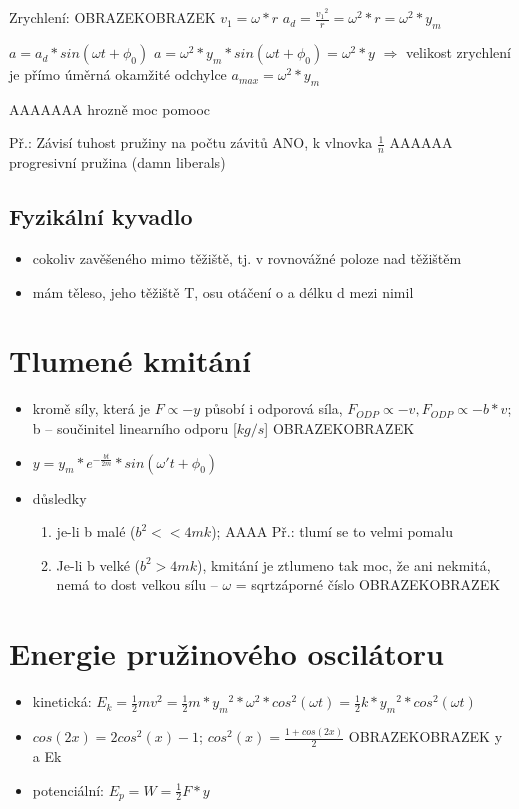 \documentclass{article}
\begin{document}
Zrychlení: OBRAZEKOBRAZEK
           $v_1 = \omega * r$
           $a_d = \frac{{v_1}^2}{r} = \omega^2 * r = \omega^2 * y_m$

           $a = a_d * sin(\omega t + {\phi}_0)$
           $a = \omega^2 * y_m * sin(\omega t + {\phi}_0) = \omega^2 * y$ $\Rightarrow$ velikost zrychlení je přímo úměrná okamžité odchylce
           $a_{max} = \omega^2 * y_m$

AAAAAAA hrozně moc pomooc

Př.: Závisí tuhost pružiny na počtu závitů
     ANO, k {vlnovka} $\frac{1}{n}$
     AAAAAA progresivní pružina (damn liberals)

\subsection{Fyzikální kyvadlo}
\begin{itemize}
  \item cokoliv zavěšeného mimo těžiště, tj. v rovnovážné poloze nad těžištěm
  \item mám těleso, jeho těžiště T, osu otáčení o a délku d mezi nimil
\end{itemize}

\section{Tlumené kmitání}
\begin{itemize}
  \item kromě síly, která je $F \propto -y$ působí i odporová síla, $F_{ODP} \propto -v, F_{ODP} \propto -b*v$; b -- součinitel linearního odporu [$kg/s$] OBRAZEKOBRAZEK
  \item $y = y_m * e^{- \frac{bt}{2m}}*sin(\omega' t + {\phi}_{0})$
  \item důsledky
  \begin{enumerate}
    \item je-li b malé ($b^2 << 4mk$); AAAA Př.: tlumí se to velmi pomalu
    \item Je-li b velké ($b^2 > 4mk$), kmitání je ztlumeno tak moc, že ani nekmitá, nemá to dost velkou sílu -- $\omega$ = sqrt{záporné číslo} OBRAZEKOBRAZEK
  \end{enumerate}
\end{itemize}

\section{Energie pružinového oscilátoru}
\begin{itemize}
  \item kinetická: $E_k = \frac{1}{2}mv^2=\frac{1}{2}m*{y_m}^2*\omega^2*cos^2(\omega t)=\frac{1}{2}k*{y_m}^2*cos^2(\omega t)$
  \item $cos(2x)=2cos^2(x)-1$; $cos^2(x) = \frac{1+cos(2x)}{2}$ OBRAZEKOBRAZEK y a Ek
  \item potenciální: $E_p = W = \frac{1}{2}F*y$
\end{itemize}
\end{document}
